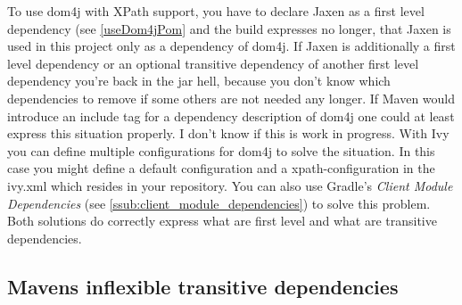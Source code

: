 To use dom4j with XPath support, you have to declare Jaxen as a first level dependency (see \ref{useDom4jPom} and the build expresses no longer, that Jaxen is used in this project only as a dependency of dom4j. If Jaxen is additionally a first level dependency or an optional transitive dependency of another first level dependency you’re back in the jar hell, because you don’t know which dependencies to remove if some others are not needed any longer. If Maven would introduce an include tag for a dependency description of dom4j one could at least express this situation properly. I don’t know if this is work in progress. With Ivy you can define multiple configurations for dom4j to solve the situation. In this case you might define a default configuration and a xpath-configuration in the ivy.xml which resides in your repository. You can also use Gradle's \emph{Client Module Dependencies} (see \ref{ssub:client_module_dependencies}) to solve this problem. Both solutions do correctly express what are first level and what are transitive dependencies.


\subsection{Mavens inflexible transitive dependencies} %
\label{sub:mavens_inflexible_transitive_dependencies}


